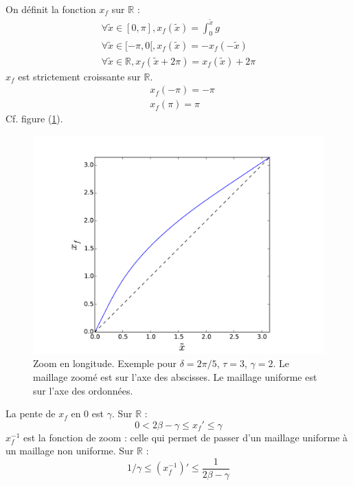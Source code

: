 \documentclass[a4paper,english,french]{article}
\begin{document}
On définit la fonction $x_f$ sur $\mathbb{R}$ :
\begin{equation*}
  \begin{array}{|l}
    \forall \tilde x \in [0, \pi], x_f(\tilde x) = \int_0 ^{\tilde x} g \\
    \forall \tilde x \in [- \pi, 0[, x_f(\tilde x) = - x_f(- \tilde x) \\
    \forall \tilde x \in \mathbb{R},
    x_f(\tilde x + 2 \pi) = x_f(\tilde x) + 2 \pi
  \end{array}
\end{equation*}
$x_f$ est strictement croissante sur $\mathbb{R}$.
\begin{align*}
  & x_f(- \pi) = - \pi \\
  & x_f(\pi) = \pi
\end{align*}
Cf. figure (\ref{fig:zoom_xf}).
\begin{figure}
  \centering
  \includegraphics[width=\textwidth]{zoom_xf}
  \caption[Zoom en longitude, fonction $x_f$]{Zoom en
    longitude. Exemple pour $\delta = 2 \pi / 5$, $\tau = 3$,
    $\gamma = 2$. Le maillage zoomé est sur l'axe des abscisses. Le
    maillage uniforme est sur l'axe des ordonnées.}
  \label{fig:zoom_xf}
\end{figure}
La pente de $x_f$ en 0 est $\gamma$. Sur $\mathbb{R}$ :
\begin{equation*}
  0 < 2 \beta - \gamma \le x_f' \le \gamma
\end{equation*}
$x_f^{-1}$ est la fonction de zoom : celle qui permet de passer d'un
maillage uniforme à un maillage non uniforme. Sur $\mathbb{R}$ :
\begin{equation*}
  1 / \gamma \le (x_f^{-1})' \le \frac{1}{2 \beta - \gamma}
\end{equation*}
\end{document}
